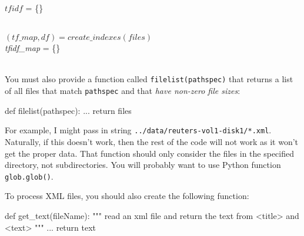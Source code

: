 \begin{fullwidth}
\begin{function}
\vspace{-4pt}
\Indp
	$tfidf$ = \{\}\\
	 \\
\end{function}

\begin{function}
\vspace{-4pt}
\Indp
	$(tf\_map, df) = create\_indexes(files)$\\
	{\em tfidf\_map} = \{\}\\
	 \\
\end{function}

You must also provide a function called {\tt filelist(pathspec)} that returns a list of all files that match {\tt pathspec} and that {\em  have non-zero file sizes}:

\begin{pyverbatim}
def filelist(pathspec):
    ...
    return files
\end{pyverbatim}
	
For example, I might pass in string {\tt\small ../data/reuters-vol1-disk1/*.xml}. Naturally, if this doesn't work, then the rest of the code will not work as it won't get the proper data.  That function should only consider the files in the specified directory, not subdirectories.  You will probably want to use Python function {\tt glob.glob()}.

To process XML files, you should also create the following function:

\begin{pyverbatim}
def get_text(fileName):
    """
    read an xml file and return the text from <title> and <text>
    """
    ...
    return text
\end{pyverbatim}


\end{fullwidth}
